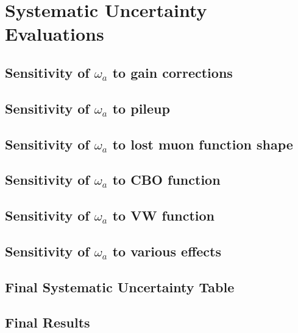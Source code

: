 \chapter{Systematic Uncertainty Evaluations}

\section{Sensitivity of \texorpdfstring{$\omega_{a}$}{} to gain corrections}

\section{Sensitivity of \texorpdfstring{$\omega_{a}$}{} to pileup}

\section{Sensitivity of \texorpdfstring{$\omega_{a}$}{} to lost muon function shape}

\section{Sensitivity of \texorpdfstring{$\omega_{a}$}{} to CBO function}

\section{Sensitivity of \texorpdfstring{$\omega_{a}$}{} to VW function}

\section{Sensitivity of \texorpdfstring{$\omega_{a}$}{} to various effects}

\section{Final Systematic Uncertainty Table}

\section{Final Results}
